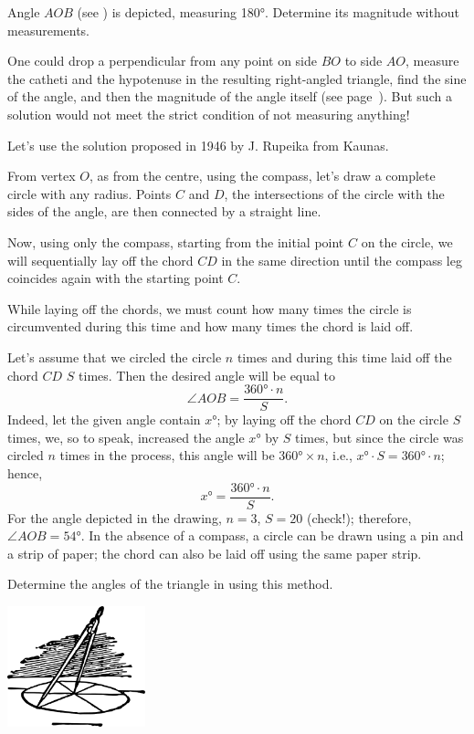 \ques Angle $AOB$ (see ) is depicted, measuring \ang{180}. Determine its magnitude without measurements.



\ans One could drop a perpendicular from any point on side $BO$ to side $AO$, measure the catheti and the hypotenuse in the resulting right-angled triangle, find the sine of the angle, and then the magnitude of the angle itself (see page~\pageref{sec-5.3}). But such a solution would not meet the strict condition of not measuring anything!


Let's use the solution proposed in 1946 by J. Rupeika from Kaunas.

From vertex $O$, as from the centre, using the compass, let's draw a complete circle with any radius. Points $C$ and $D$, the intersections of the circle with the sides of the angle, are then connected by a straight line.

Now, using only the compass, starting from the initial point $C$ on the circle, we will sequentially lay off the chord $CD$ in the same direction until the compass leg coincides again with the starting point $C$.

While laying off the chords, we must count how many times the circle is circumvented during this time and how many times the chord is laid off.

Let's assume that we circled the circle $n$ times and during this time laid off the chord $CD$ $S$ times. Then the desired angle will be equal to 
\begin{equation*}%
\angle AOB = \frac{\ang{360}\cdot n}{S}.
\end{equation*}
Indeed, let the given angle contain $x \si{\degree}$; by laying off the chord $CD$ on the circle $S$ times, we, so to speak, increased the angle $x \si{\degree}$ by $S$ times, but since the circle was circled $n$ times in the process, this angle will be $\ang{360} \times n$, i.e., $x \si{\degree} \cdot S = \ang{360} \cdot n$; hence, 
\begin{equation*}%
x \si{\degree} = \frac{360° \cdot n}{S}.
\end{equation*}
For the angle depicted in the drawing, $n = 3$, $S = 20$ (check!); therefore, $ \angle AOB = \ang{54}$. In the absence of a compass, a circle can be drawn using a pin and a strip of paper; the chord can also be laid off using the same paper strip.

\ques Determine the angles of the triangle in  using this method.

\begin{center}
\includegraphics[width=0.3\textwidth]{figures/ch-05/fig-ch-05-tail.pdf}
\end{center}


















